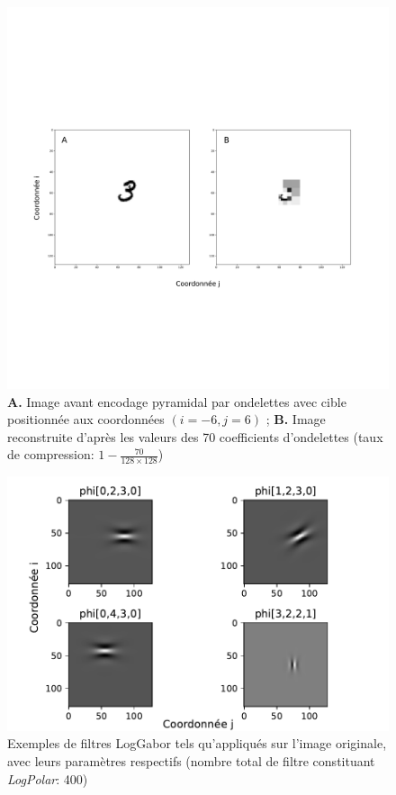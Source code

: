\begin{figure}[th]
\centering
\includegraphics[scale=0.25]{Figures/wavelet_effect}
\decoRule %
\caption[Figure]{\textbf{A.} Image avant encodage pyramidal par ondelettes avec cible positionnée aux coordonnées $(i=-6,j=6)$ ; \textbf{B.} Image reconstruite d'après les valeurs des 70 coefficients d'ondelettes (taux de compression: $1-\frac{70}{128\times128}$)}
\label{fig:Wavelet_effect}
\end{figure}

\begin{figure}[th]
\centering
\includegraphics{Figures/Gabor_filter}
\decoRule %
\caption[Figure]{Exemples de filtres LogGabor tels qu'appliqués sur l'image originale, avec leurs paramètres respectifs (nombre total de filtre constituant \textit{LogPolar}: 400)}
\label{fig:Gabor_filter}
\end{figure}

